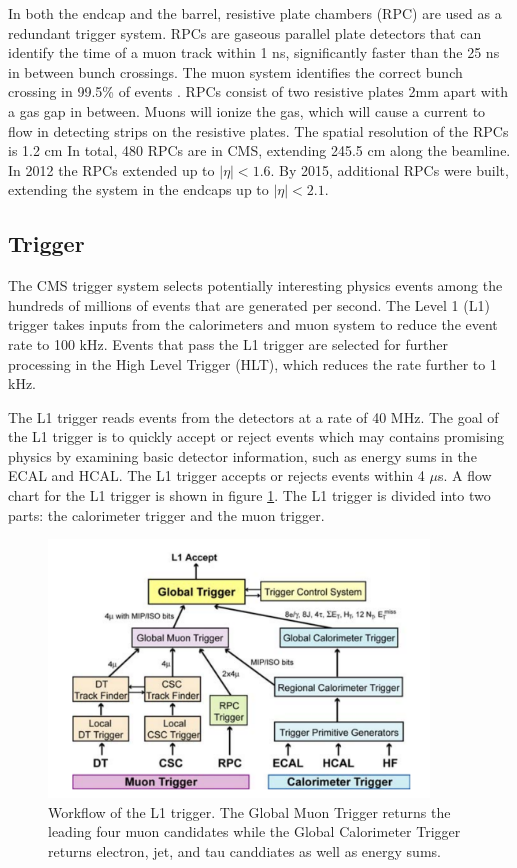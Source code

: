 \documentclass[oneside, letterpaper, oldfontcommands]{memoir}
\begin{document}
\qquad In both the endcap and the barrel, resistive plate chambers (RPC) are used as a redundant trigger system. RPCs are gaseous parallel plate detectors that can identify the time of a muon track within 1 ns,  significantly faster than the 25 ns in between bunch crossings. The muon system identifies the correct bunch crossing in 99.5\% of events \cite{Chatrchyan:2013sba}. RPCs consist of two resistive plates 2mm apart with a gas gap in between. Muons will ionize the gas, which will cause a current to flow in detecting strips on the resistive plates. The spatial resolution of the RPCs is 1.2 cm\cite{Chatrchyan:2013sba} In total, 480 RPCs are in CMS, extending 245.5 cm along the beamline. In 2012 the RPCs extended up to $|\eta| < 1.6$. By 2015, additional RPCs were built, extending the system in the endcaps up to $|\eta| < 2.1$.

\subsection{Trigger}\label{trigger}
\qquad The CMS trigger system selects potentially interesting physics events among the hundreds of millions of events that are generated per second. The Level 1 (L1) trigger takes inputs from the calorimeters and muon system to reduce the event rate to 100 kHz. Events that pass the L1 trigger are selected for further processing in the  High Level Trigger (HLT), which reduces the rate further to 1 kHz.

\qquad The L1 trigger reads events from the detectors at a rate of 40 MHz. The goal of the L1 trigger is to quickly accept or reject events which may contains promising physics by examining basic detector information, such as energy sums in the ECAL and HCAL. The L1 trigger accepts or rejects events within 4 $\mu$s. A flow chart for the L1 trigger is shown in figure \ref{fig:L1Trigger}. The L1 trigger is divided into two parts: the calorimeter trigger and the muon trigger. 

\begin{figure}[here]
\includegraphics[width=0.9\textwidth]{L1trigger.png}
\caption{Workflow of the L1 trigger. The Global Muon Trigger returns the leading four muon candidates while the Global Calorimeter Trigger returns electron, jet, and tau canddiates as well as energy sums.\cite{1748-0221-3-08-S08001}}
\label{fig:L1Trigger}
\end{figure}
\end{document}
